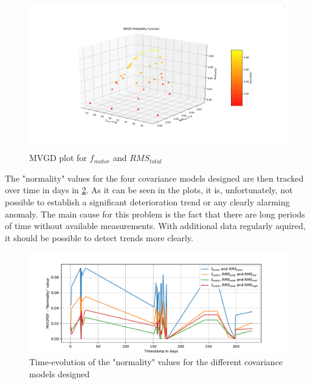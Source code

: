 \documentclass[conference]{IEEEtran}
\begin{document}
\begin{figure}[htbp]
\centerline{\includegraphics[width=\columnwidth]{graphics/mvgd_plots/plot1_fmotor_rmstotal.pdf}}
\caption{MVGD plot for $f_{motor}$ and $RMS_{total}$}
\label{fig_mvgd_plot1}
\end{figure}

The "normality" values for the four covariance models designed are then tracked over time in days in \ref{fig_controlchart_all}. As it can be seen in the plots, it is, unfortunately, not possible to establish a significant deterioration trend or any clearly alarming anomaly. The main cause for this problem is the fact that there are long periods of time without available measurements. With additional data regularly aquired, it should be possible to detect trends more clearly.



\begin{figure}[htbp]
\centerline{\includegraphics[width=\columnwidth]{graphics/control_charts/control_chart_v02.pdf}}
\caption{Time-evolution of the "normality" values for the different covariance models designed}
\label{fig_controlchart_all}
\end{figure}
\end{document}
